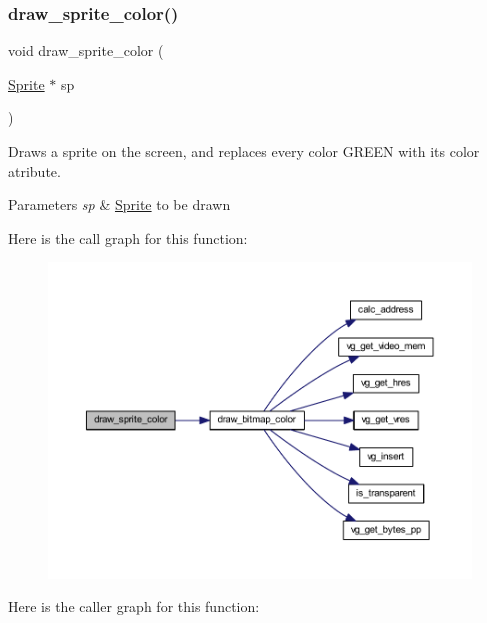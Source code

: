 \subsubsection{\texorpdfstring{draw\+\_\+sprite\+\_\+color()}{draw\_sprite\_color()}}
{\footnotesize\ttfamily void draw\+\_\+sprite\+\_\+color (\begin{DoxyParamCaption}\item[{\mbox{\hyperlink{struct_sprite}{Sprite}} $\ast$}]{sp }\end{DoxyParamCaption})}



Draws a sprite on the screen, and replaces every color G\+R\+E\+EN with its color atribute. 


\begin{DoxyParams}{Parameters}
{\em sp} & \mbox{\hyperlink{struct_sprite}{Sprite}} to be drawn \\
\hline
\end{DoxyParams}
Here is the call graph for this function\+:\nopagebreak
\begin{figure}[H]
\begin{center}
\leavevmode
\includegraphics[width=350pt]{group__sprite_gab5aa8ee6efdb9ebf62df81cad24c445c_cgraph}
\end{center}
\end{figure}
Here is the caller graph for this function\+:\nopagebreak
